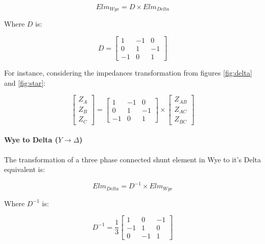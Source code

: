 \documentclass{tufte-book}
\begin{document}
\begin{equation}
Elm_{Wye} = D \times Elm_{Delta}
\end{equation}

Where $D$ is:

\begin{equation}
D = \left[ \begin{array}{ccc}
1 & -1 & 0 \\
0 & 1 & -1 \\
-1 & 0 & 1
\end{array} \right]
\end{equation}

For instance, considering the impedances transformation from figures \ref{fig:delta} and \ref{fig:star}:

\begin{equation}
\left[ \begin{array}{c}
Z_A \\
Z_B \\
Z_C
\end{array} \right] = \left[ \begin{array}{ccc}
1 & -1 & 0 \\
0 & 1 & -1 \\
-1 & 0 & 1
\end{array} \right] \times \left[ \begin{array}{c}
Z_{AB} \\
Z_{AC} \\
Z_{BC}
\end{array} \right]
\end{equation}

\paragraph{Wye to Delta ($Y\rightarrow \Delta$)} The transformation of a three phase connected shunt element in Wye to it's Delta equivalent is:

\begin{equation}
Elm_{Delta} = D^{-1} \times Elm_{Wye}
\end{equation}

Where $D^{-1}$ is:

\begin{equation}
D^{-1} = \frac{1}{3} \left[ \begin{array}{ccc}
1 & 0 & -1 \\
-1 & 1 & 0 \\
0 & -1 & 1
\end{array} \right]
\end{equation}
\end{document}
